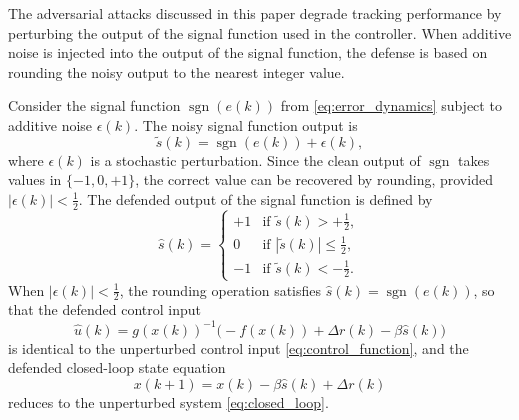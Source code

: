 The adversarial attacks discussed in this paper degrade tracking performance by
perturbing the output of the signal function used in the controller. When
additive noise is injected into the output of the signal function, the defense is based on
rounding the noisy output to the nearest integer value.

Consider the signal function $\operatorname{sgn}(e(k))$ from
\eqref{eq:error_dynamics} subject to additive noise $\epsilon(k)$. The
noisy signal function output is
\begin{equation}
	\label{eq:noisy_sgn}
	\widetilde{s}(k) = \operatorname{sgn}(e(k)) + \epsilon(k),
\end{equation}
where $\epsilon(k)$ is a stochastic perturbation. Since the clean output of
$\operatorname{sgn}$ takes values in $\{-1, 0, +1\}$, the correct value can
be recovered by rounding, provided $|\epsilon(k)| < \tfrac{1}{2}$. The
defended output of the signal function is defined by
\begin{equation}
	\label{eq:rounding_defense}
	\hat{s}(k) =
	\begin{cases}
		+1 & \text{if } \widetilde{s}(k) > +\tfrac{1}{2},  \\[4pt]
		0  & \text{if } |\widetilde{s}(k)| \leq \tfrac{1}{2}, \\[4pt]
		-1 & \text{if } \widetilde{s}(k) < -\tfrac{1}{2}.
	\end{cases}
\end{equation}
When $|\epsilon(k)| < \tfrac{1}{2}$, the rounding operation satisfies
$\hat{s}(k) = \operatorname{sgn}(e(k))$, so that the defended control input
\begin{equation}
	\label{eq:defended_control}
	\hat{u}(k) = g(x(k))^{-1} \bigl( -f(x(k)) + \Delta r(k) - \beta \hat{s}(k) \bigr)
\end{equation}
is identical to the unperturbed control input \eqref{eq:control_function},
and the defended closed-loop state equation
\begin{equation}
	\label{eq:defended_closed_loop}
	x(k+1) = x(k) - \beta \hat{s}(k) + \Delta r(k)
\end{equation}
reduces to the unperturbed system \eqref{eq:closed_loop}.
